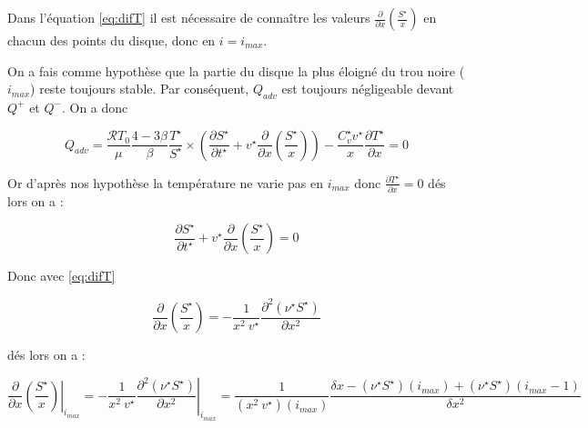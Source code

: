 Dans l'équation \eqref{eq:difT} il est nécessaire de connaître les valeurs $\frac{\partial}{\partial x}\left(\frac{S^{\star}}{x}\right)$ en chacun des points du disque, donc en $i=i_{max}$. 

On a fais comme hypothèse que la partie du disque la plus éloigné du trou noire ($i_{max}$) reste toujours stable. Par conséquent, $Q_{adv}$ est toujours négligeable devant $Q^+$ et $Q^-$. On a donc 

\begin{equation}
Q_{adv}=\frac{\mathcal{R} T_0}{\mu} \frac{4-3\beta}{\beta} \frac{T^\star}{S^\star} \times
        \left( \frac{\partial S^\star}{\partial t^\star} + v^\star \frac{\partial}{\partial x} \left(\frac{S^\star}{x}\right) \right) -
        \frac{C_v^\star v^\star}{x} \frac{\partial T^\star}{\partial x}=0
\end{equation}

Or d'après nos hypothèse la température ne varie pas en $i_{max}$ donc $\frac{\partial T^\star}{\partial x} =0$ dés lors on a :


\begin{equation}
  \frac{\partial S^{\star}}{\partial t^{\star}} + v^{\star} \frac{\partial}{\partial x} \left(\frac{S^{\star}}{x}\right)=0
\end{equation}

Donc avec \eqref{eq:difT}

\begin{equation}
  \frac{\partial}{\partial x} \left(\frac{S^{\star}}{x}\right) = -\frac{1}{x^2\ v^{\star}} \frac{\partial^2 (\nu^{\star} S^{\star})}{\partial x^2}
\end{equation}

dés lors on a :

\begin{equation}
\left. \frac{\partial}{\partial x} \left(\frac{S^{\star}}{x}\right) \right|_{i_{max}} = \left. -\frac{1}{x^2\ v^{\star}} \frac{\partial^2 (\nu^{\star} S^{\star})}{\partial x^2} \right|_{i_{max}} = \frac{1}{(x^2\ v^{\star})(i_{max})} \frac{\delta x - (\nu^{\star} S^{\star})(i_{max}) + (\nu^{\star} S^{\star})(i_{max}-1)}{\delta x^2}
\end{equation}


